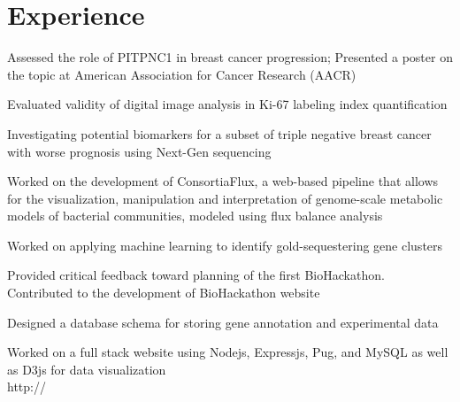 \documentclass[]{deedy-resume-openfont}
\begin{document}
\begin{minipage}[t]{0.66\textwidth}


\section{Experience}
\vspace{\topsep} %
\begin{tightemize}
\item \href{https://github.com/tt6746690/courseProjects/blob/master/ROP299/manuscript/manuscript.pdf}{} Assessed the role of PITPNC1 in breast cancer progression; Presented a poster on the topic at American Association for Cancer Research (AACR)
\item \href{https://github.com/tt6746690/courseProjects/blob/master/doneLab2016/ki67Paper/manuscript/template.pdf}{} Evaluated validity of digital image analysis in Ki-67 labeling index quantification
\item Investigating potential biomarkers for a subset of triple negative breast cancer with worse prognosis using Next-Gen sequencing
\end{tightemize}
\sectionsep

\begin{tightemize}
\item Worked on the development of ConsortiaFlux, a web-based pipeline that allows for the visualization, manipulation and interpretation of genome-scale metabolic models of bacterial communities, modeled using flux balance analysis
\item Worked on applying machine learning to identify gold-sequestering gene clusters
\item Provided critical feedback toward planning of the first BioHackathon. Contributed to the development of BioHackathon website
\end{tightemize}
\sectionsep

\begin{tightemize}
\item Designed a database schema for storing gene annotation and experimental data
\item Worked on a full stack website using Nodejs, Expressjs, Pug, and MySQL as well as D3js for data visualization \\ http:// \href{http://159.203.47.10}{}
\end{tightemize}
\sectionsep



\end{minipage}
\end{document}
